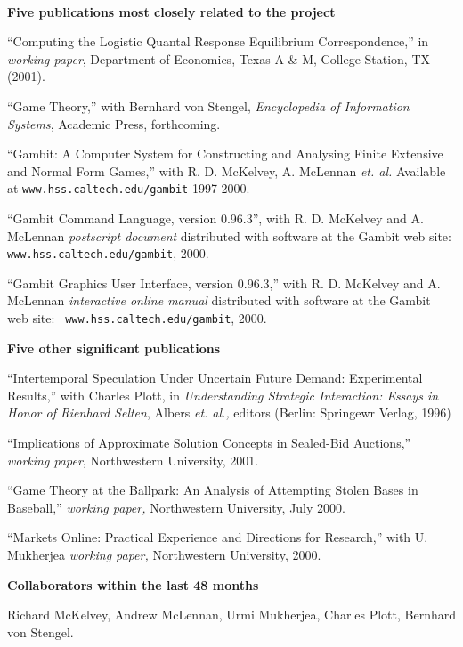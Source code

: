 \documentclass[12pt]{article}
\begin{document}
\ \\
\noindent
{\bf Five publications most closely related to the project}
\begin{description}
\item
``Computing the Logistic Quantal Response Equilibrium
Correspondence,'' in {\it working paper}, Department of Economics,
Texas A \& M, College Station, TX (2001).
\item
``Game Theory,'' with Bernhard von Stengel, {\it Encyclopedia of
Information Systems}, Academic Press, forthcoming.
\item 
``Gambit: A Computer System for Constructing and Analysing Finite
Extensive and Normal Form Games,'' with R. D. McKelvey, A. McLennan
{\it et. al.}  Available at {\tt www.hss.caltech.edu/gambit} 1997-2000.
\item 
``Gambit Command Language, version 0.96.3'', with R. D. McKelvey and
A. McLennan {\it postscript document} distributed with software at the
Gambit web site: {\tt www.hss.caltech.edu/gambit}, 2000.
\item 
``Gambit Graphics User Interface, version 0.96.3,'' with
R. D. McKelvey and A. McLennan {\it interactive online manual}
distributed with software at the Gambit web site: {\tt
www.hss.caltech.edu/gambit}, 2000.
\end{description}

\noindent
{\bf Five other significant publications}
\begin{description}
\item 
``Intertemporal Speculation Under Uncertain Future Demand:
Experimental Results,'' with Charles Plott, in {\it Understanding
Strategic Interaction: Essays in Honor of Rienhard Selten}, Albers
{\it et. al.,} editors (Berlin: Springewr Verlag, 1996)
\item
``Implications of Approximate Solution Concepts in Sealed-Bid
Auctions,'' {\it working paper}, Northwestern University, 2001.  
\item
``Game Theory at the Ballpark: An Analysis of Attempting Stolen Bases
in Baseball,'' {\it working paper,} Northwestern University, July
2000.
\item
``Markets Online: Practical Experience and Directions for Research,''
with U. Mukherjea {\it working paper,}  Northwestern University, 2000.
\end{description}



\noindent
{\bf Collaborators within the last 48 months} 

Richard McKelvey, Andrew McLennan, Urmi Mukherjea, Charles Plott,
Bernhard von Stengel.
\end{document}
